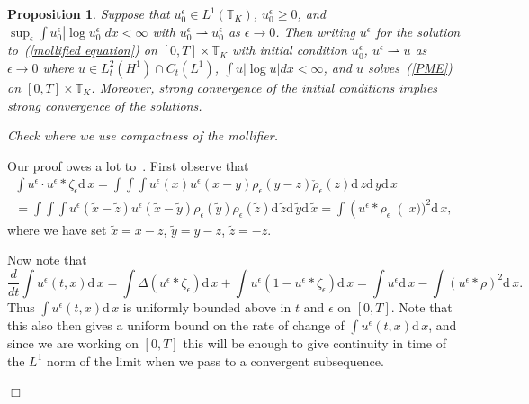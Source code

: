 \documentclass[12pt]{article}
\newenvironment {proof}{{\noindent\bf Proof }}{\hfill $\Box$ \medskip}
\newtheorem{proposition}[theorem]{Proposition}
\def \tilde{\widetilde}
\newcommand{\IT}{\mathbb T}
\newcommand{\dif}{\mathrm{d}\,}
\newcommand{\comment}[1]{{\color{blue} \it #1}}
\begin{document}
\begin{proposition}
Suppose that $u_0^\epsilon\in L^1(\IT_K)$, $u_0^\epsilon\geq 0$, and
$\sup_\epsilon\int u_0^\epsilon|\log u_0^\epsilon|dx<\infty$ with
$u_0^\epsilon\rightharpoonup u_0^\epsilon$ as $\epsilon\to 0$. Then
writing $u^\epsilon$ for the solution to~(\ref{mollified equation})
on $[0,T]\times \IT_K$ with
initial condition $u_0^\epsilon$,
$u^\epsilon\rightharpoonup u$ as $\epsilon\to 0$ where
$u\in L_t^2(H^1)\cap C_t(L^1)$, $\int u|\log u| dx<\infty$, and
$u$ solves~(\ref{PME}) on $[0,T]\times \IT_K$. Moreover, strong convergence
of the initial conditions implies strong convergence of the solutions.
\end{proposition}

\begin{proof}
    \comment{Check where we use compactness of the mollifier.}

Our proof owes a lot to~\cite{lions/mas-gallic:2001}.
First observe that
\begin{multline*}
\int u^\epsilon\cdot u^\epsilon*\zeta_\epsilon\dif x
= \int\int\int u^\epsilon(x)u^\epsilon(x-y)\rho_\epsilon(y-z)
\check{\rho}_\epsilon(z)\dif z\dif y\dif x
\\
=
\int\int\int u^\epsilon(\tilde{x}-\tilde{z})
u^\epsilon(\tilde{x}-\tilde{y})
\rho_\epsilon(\tilde{y})
\rho_\epsilon(\tilde{z})\dif \tilde{z}\dif \tilde{y}\dif \tilde{x}
=\int\left(u^\epsilon*\rho_\epsilon\right(x))^2\dif x,
\end{multline*}
where we have set $\tilde{x}=x-z$, $\tilde{y}=y-z$, $\tilde{z}=-z$.

Now note that
$$\frac{d}{dt}\int u^\epsilon (t,x) \dif x=\int \Delta (u^\epsilon*\zeta_\epsilon)\dif x
+\int u^\epsilon(1-u^\epsilon*\zeta_\epsilon)\dif x= \int u^\epsilon \dif x
-\int (u^\epsilon*\rho)^2 \dif x.$$
Thus $\int u^\epsilon(t,x)\dif x$ is uniformly bounded above in $t$
and $\epsilon$ on $[0,T]$. Note that this also then gives a uniform
bound on the rate of change of $\int u^\epsilon (t,x) \dif x$, and since
we are working on $[0,T]$ this will be enough to give continuity in time of the
$L^1$ norm of the limit
when we pass to a convergent subsequence.


\end{proof}
\end{document}
